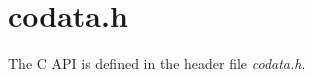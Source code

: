 \chapter{codata.h}
The C API is defined in the header file \emph{codata.h}.

\inputminted{C}{../../../include/codata.h}
